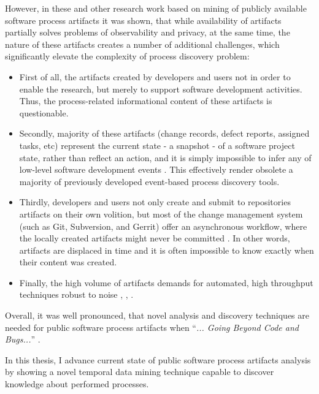 However, in these and other research work based on mining of publicly available software process artifacts 
it was shown, that while availability of artifacts partially solves problems of observability and privacy, 
at the same time, the nature of these artifacts creates a number of additional challenges, which significantly
elevate the complexity of process discovery problem:
\begin{itemize}
\item First of all, the artifacts created by developers and users not in order to enable the research,
but merely to support software development activities. Thus, the process-related informational content of these
artifacts is questionable.
\item Secondly, majority of these artifacts (change records, defect reports, assigned tasks, etc) represent the current 
state - a snapshot - of a software project state, rather than reflect an action, and it is simply impossible to
infer any of low-level software development events \cite{citeulike:1296888}.
This effectively render obsolete a majority of previously developed event-based process discovery tools.
\item Thirdly, developers and users not only create and submit to repositories artifacts on their own volition,
but most of the change management system (such as Git, Subversion, and Gerrit) offer an asynchronous workflow, 
where the locally created artifacts might never be committed \cite{citeulike:2280690} \cite{citeulike:9037939}. In other
words, artifacts are displaced in time and it is often impossible to know exactly when their content was created.
 \item Finally, the high volume of artifacts demands for automated, high throughput techniques robust to noise
 \cite{citeulike:12550438}, \cite{citeulike:7853299}, \cite{citeulike:4534888}.
\end{itemize}
Overall, it was well pronounced, that novel analysis and discovery techniques are needed for public software process
artifacts when ``\textit{... Going Beyond Code and Bugs...}'' \cite{citeulike:7853299}.

In this thesis, I advance current state of public software process artifacts analysis by showing a novel temporal data
mining technique capable to discover knowledge about performed processes.

